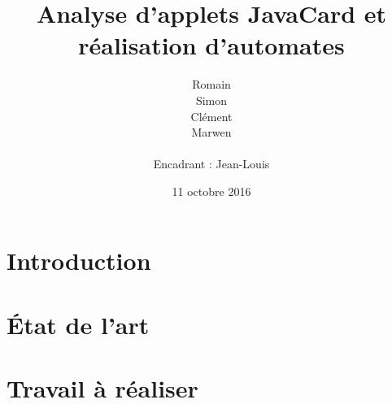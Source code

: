 \documentclass[a4paper, 11pt]{article}
\title{Analyse d'applets JavaCard et réalisation d'automates}
\author{Romain \bsc{Barrat} \\
  Simon \bsc{Garrelou} \\
  Clément \bsc{Jarrige} \\
  Marwen \bsc{Sami} \\
  ~\\
  Encadrant : Jean-Louis \bsc{Lanet}}
\date{11 octobre 2016}
\begin{document}
\maketitle

\section*{Introduction}


\section{État de l'art}


\section{Travail à réaliser}

\end{document}
